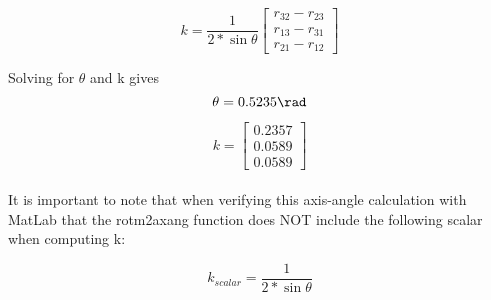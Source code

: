\documentclass[12pt]{article}
\begin{document}
\begin{equation}
k = \frac{1}{2*\sin{\theta}}
\begin{bmatrix} r_{32}-r_{23}\\r_{13}-r_{31}\\ r_{21}-r_{12} \end{bmatrix}
\end{equation}

\newpage
Solving for $\theta$ and k gives
\\

\begin{equation}
\theta = 0.5235 \rad 
\end{equation}

\begin{equation}
k = 
\begin{bmatrix} 0.2357\\0.0589\\ 0.0589 \end{bmatrix}
\end{equation}
\\
It is important to note that when verifying this axis-angle calculation with MatLab that the rotm2axang function does NOT include the following scalar when computing k:

\begin{equation}
k_{scalar} = \frac{1}{2*\sin{\theta}}
\end{equation}
\end{document}
